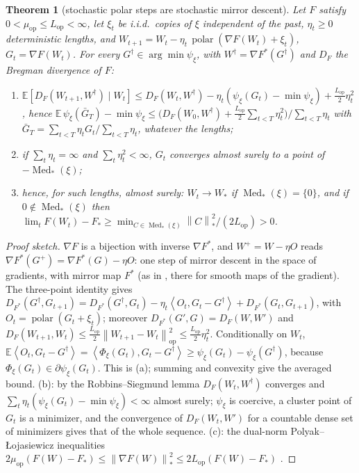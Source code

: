 \documentclass[10pt]{article}
\newtheorem{theorem}{Theorem}
\theoremstyle{remark}
\newcommand{\E}{\mathbb{E}}
\newcommand{\nop}[1]{\left\|#1\right\|_{\mathrm{op}}}
\newcommand{\nnuc}[1]{\left\|#1\right\|_{*}}
\newcommand{\inner}[2]{\left\langle #1, #2 \right\rangle}
\newcommand{\polar}{\operatorname{polar}}
\newcommand{\Med}{\operatorname{Med}_\ast}
\newcommand{\Lop}{L_{\mathrm{op}}}
\newcommand{\muop}{\mu_{\mathrm{op}}}
\begin{document}
\begin{theorem}[stochastic polar steps are stochastic mirror descent]\label{thm:smd}
Let $F$ satisfy $0<\muop\le\Lop<\infty$, let $\xi_t$ be i.i.d.\ copies of $\xi$ independent of the past, $\eta_t\ge0$
deterministic lengths, and $W_{t+1}=W_t-\eta_t\,\polar(\nabla F(W_t)+\xi_t)$, $G_t=\nabla F(W_t)$. For every
$G^\dagger\in\arg\min\psi_\xi$, with $W^\dagger=\nabla F^\ast(G^\dagger)$ and $D_F$ the Bregman divergence of $F$:
\begin{enumerate}[label=(\alph*),itemsep=0pt,topsep=2pt]
\item $\E[D_F(W_{t+1},W^\dagger)\mid W_t]\le D_F(W_t,W^\dagger)-\eta_t(\psi_\xi(G_t)-\min\psi_\xi)+\frac{\Lop}2\eta_t^2$,
hence $\E\,\psi_\xi(\bar G_T)-\min\psi_\xi\le\big(D_F(W_0,W^\dagger)+\frac{\Lop}2\sum_{t<T}\eta_t^2\big)/\sum_{t<T}\eta_t$
with $\bar G_T=\sum_{t<T}\eta_tG_t/\sum_{t<T}\eta_t$, whatever the lengths;
\item if $\sum_t\eta_t=\infty$ and $\sum_t\eta_t^2<\infty$, $G_t$ converges almost surely to a point of $-\Med(\xi)$;
\item hence, for such lengths, almost surely: $W_t\to W_\ast$ if $\Med(\xi)=\{0\}$, and if $0\notin\Med(\xi)$ then
$\lim_tF(W_t)-F_\ast\ge\min_{C\in\Med(\xi)}\nnuc C^2/(2\Lop)>0$.
\end{enumerate}
\end{theorem}
\begin{proof}[Proof sketch]
$\nabla F$ is a bijection with inverse $\nabla F^\ast$, and $W^+=W-\eta O$ reads $\nabla F^\ast(G^+)=\nabla F^\ast(G)-\eta
O$: one step of mirror descent in the space of gradients, with mirror map $F^\ast$ (as in \cite{maddison2021dual}, there for smooth maps of the gradient). The
three-point identity gives
$D_{F^\ast}(G^\dagger,G_{t+1})=D_{F^\ast}(G^\dagger,G_t)-\eta_t\inner{O_t}{G_t-G^\dagger}+D_{F^\ast}(G_t,G_{t+1})$, with
$O_t=\polar(G_t+\xi_t)$; moreover $D_{F^\ast}(G',G)=D_F(W,W')$ and $D_F(W_{t+1},W_t)\le\frac{\Lop}2\nop{W_{t+1}-W_t}^2\le
\frac{\Lop}2\eta_t^2$. Conditionally on $W_t$, $\E\inner{O_t}{G_t-G^\dagger}=\inner{\Phi_\xi(G_t)}{G_t-G^\dagger}\ge
\psi_\xi(G_t)-\psi_\xi(G^\dagger)$, because $\Phi_\xi(G_t)\in\partial\psi_\xi(G_t)$. This is (a); summing and convexity
give the averaged bound. (b): by the Robbins--Siegmund lemma $D_F(W_t,W^\dagger)$ converges and
$\sum_t\eta_t(\psi_\xi(G_t)-\min\psi_\xi)<\infty$ almost surely; $\psi_\xi$ is coercive, a cluster point of $G_t$ is a
minimizer, and the convergence of $D_F(W_t,W')$ for a countable dense set of minimizers gives that of the whole
sequence. (c): the dual-norm Polyak--\L{}ojasiewicz inequalities
$2\muop(F(W)-F_\ast)\le\nnuc{\nabla F(W)}^2\le2\Lop(F(W)-F_\ast)$ \cite{kakade2012regularization,balles2020geometry}.
\end{proof}
\end{document}
